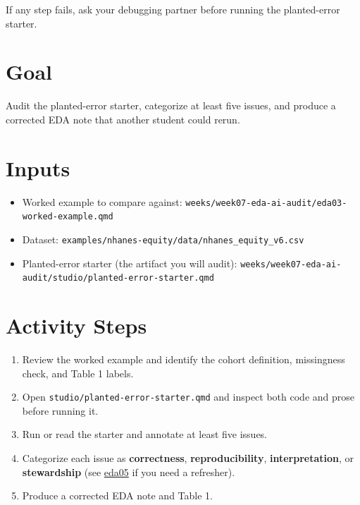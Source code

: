 \documentclass[
  letterpaper,
  DIV=11,
  numbers=noendperiod,
  oneside]{scrreprt}
\providecommand{\tightlist}{%
  \setlength{\itemsep}{0pt}\setlength{\parskip}{0pt}}
\begin{document}
If any step fails, ask your debugging partner before running the
planted-error starter.

\section*{Goal}\label{goal-6}


Audit the planted-error starter, categorize at least five issues, and
produce a corrected EDA note that another student could rerun.

\section*{Inputs}\label{inputs-1}


\begin{itemize}
\tightlist
\item
  Worked example to compare against:
  \texttt{weeks/week07-eda-ai-audit/eda03-worked-example.qmd}
\item
  Dataset: \texttt{examples/nhanes-equity/data/nhanes\_equity\_v6.csv}
\item
  Planted-error starter (the artifact you will audit):
  \texttt{weeks/week07-eda-ai-audit/studio/planted-error-starter.qmd}
\end{itemize}

\section*{Activity Steps}\label{activity-steps-1}


\begin{enumerate}
\def\labelenumi{\arabic{enumi}.}
\tightlist
\item
  Review the worked example and identify the cohort definition,
  missingness check, and Table 1 labels.
\item
  Open \texttt{studio/planted-error-starter.qmd} and inspect both code
  and prose before running it.
\item
  Run or read the starter and annotate at least five issues.
\item
  Categorize each issue as \textbf{correctness},
  \textbf{reproducibility}, \textbf{interpretation}, or
  \textbf{stewardship} (see
  \hyperref[four-audit-categories-for-ai-drafted-eda]{eda05} if you need
  a refresher).
\item
  Produce a corrected EDA note and Table 1.
\end{enumerate}
\end{document}
